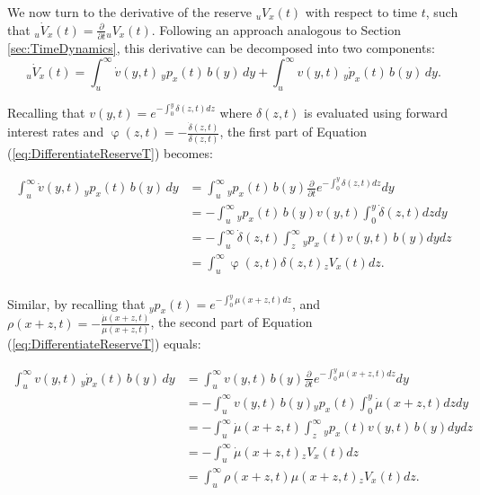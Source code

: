 \documentclass[12pt]{article}
\begin{document}
We now turn to the derivative of the reserve ${}_uV_x(t)$ with respect to time $t$, such that ${}_u\dot{V}_x(t)=\frac{\partial  }{\partial t}{}_uV_x(t)$. Following an approach analogous to Section \ref{sec:TimeDynamics}, this derivative can be decomposed into two components:
\begin{equation}\label{eq:DifferentiateReserveT}
	{}_u\dot{V}_x(t) = \int_u^\infty \dot{v}(y,t) \, {}_yp_x(t) \, b(y) \, dy + \int_u^\infty v(y,t) \, {}_y\dot{p}_x(t) \, b(y) \, dy.
\end{equation}

Recalling that ${v}(y,t)=e^{-\int_{0}^{y}\delta(z,t)dz}$ where $\delta(z,t)$ is evaluated using forward interest rates and $\upvarphi(z,t)= -\frac{\dot{\delta}(z,t)}{\delta(z,t)}$, the first part of Equation (\ref{eq:DifferentiateReserveT}) becomes:

\begin{equation}\label{eq:DifferentiateReserveTP1}
	\begin{split}
		\int_u^\infty \dot{v}(y,t) \, {}_yp_x(t) \, b(y) \, dy &= \int_u^\infty {}_yp_x(t)\, b(y)   \frac{\partial  }{\partial t} e^{-\int_0^{y}{\delta}(z,t)dz}dy\\
		&= -\int_u^\infty {}_yp_x(t)\, b(y) v(y,t) \int_0^{y}\dot{\delta}(z,t)dz dy\\
		&= -\int_u^\infty  \dot{\delta}(z,t)\int_z^{\infty} {}_yp_x(t) v(y,t) \, b(y) dy dz\\
		&= \int_u^\infty  \upvarphi(z,t) \delta(z,t)  {}_z{V}_x(t) dz.\\
	\end{split}
\end{equation}

Similar, by recalling that ${}_yp_x(t)=e^{-\int_{0}^{y}\mu(x+z,t)dz}$, and $\rho(x+z,t) = - \frac{\dot{\mu}(x+z,t)}{\mu(x+z,t)}$, the second part of Equation (\ref{eq:DifferentiateReserveT}) equals:


\begin{equation}\label{eq:DifferentiateReserveTP2}
	\begin{split}
		\int_u^\infty v(y,t) \, {}_y\dot{p}_x(t) \, b(y) \, dy &= \int_u^\infty   v(y,t) \, b(y) \frac{\partial  }{\partial t}e^{-\int_0^{y}{\mu}(x+z,t)dz}dy\\
		&= -\int_u^\infty   v(y,t) \, b(y) {}_yp_x(t)\int_0^{y}\dot{\mu}(x+z,t)dzdy\\
		&= -\int_u^\infty  \dot{\mu}(x+z,t) \int_z^{\infty}  {}_yp_x(t) v(y,t)\, b(y) dydz\\
		&= - \int_u^\infty \dot{\mu}(x+z,t)   {}_z{V}_x(t) dz\\
		&= \int_u^\infty \rho(x+z,t) \mu(x+z,t)   {}_z{V}_x(t) dz.\\
	\end{split}
\end{equation}
\end{document}
